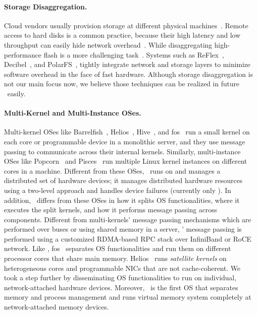 \paragraph{Storage Disaggregation.}
Cloud vendors usually provision storage at different physical machines~\cite{deepview-nsdi18,url:aws-storage,url:vmware-vSAN}.
Remote access to hard disks is a common practice, because their high latency and low throughput
can easily hide network overhead~\cite{petal-asplos96,blizzard-nsdi14,Parallax-hotos15,Legtchenko-hotstorage17}.
While disaggregating high-performance flash is a more challenging task~\cite{FlashDisaggregation,url:facebook-lighting}.
Systems such as ReFlex~\cite{ReFlex}, Decibel~\cite{decibel-nsdi17}, and PolarFS~\cite{PolarFS-VLDB18},
tightly integrate network and storage layers to minimize software overhead in the face of fast hardware.
Although storage disaggregation is not our main focus now,
we believe those techniques can be realized in future \lego\ easily.

\paragraph{Multi-Kernel and Multi-Instance OSes.}
Multi-kernel OSes like Barrelfish~\cite{Baumann-SOSP09,Barrelfish-DC}, Helios~\cite{Helios-SOSP}, Hive~\cite{Hive-SOSP}, and fos~\cite{fos-SOCC}
run a small kernel on each core or programmable device in a monolithic server,
and they use message passing to communicate across their internal kernels.
Similarly, multi-instance OSes like Popcorn~\cite{popcorn-eurosys15} and Pisces~\cite{Pisces-hpdc15} run multiple Linux kernel instances
on different cores in a machine. %
Different from these OSes, \lego\ runs on and manages a distributed set of hardware devices;
it manages distributed hardware resources using a two-level approach and handles device failures (currently only \mcomponent).
In addition, \lego\ differs from these OSes in how it splits OS functionalities, where it executes the split kernels,
and how it performs message passing across components.
Different from multi-kernels' message passing mechanisms which are performed over buses or using shared memory in a server, 
\lego' message passing is performed using a customized RDMA-based RPC stack over InfiniBand or RoCE network.
Like \lego, fos~\cite{fos-SOCC} separates OS functionalities and run them on different processor cores that share main memory.
Helios~\cite{Helios-SOSP} runs {\em satellite kernels} on heterogeneous cores and programmable NICs that are not cache-coherent.
We took a step further by disseminating OS functionalities to run on individual, network-attached hardware devices. %
Moreover, \lego\ is the first OS that separates memory and process management and runs virtual memory system completely at network-attached memory devices.

